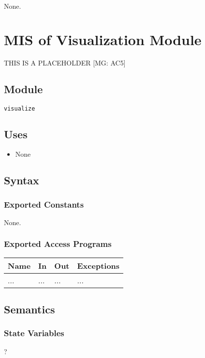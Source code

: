\documentclass[12pt, titlepage]{article}
\begin{document}
None.

\newpage
\section{MIS of Visualization Module} \label{mVisual} 

THIS IS A PLACEHOLDER [MG: AC5]

\subsection{Module}
\texttt{visualize}

\subsection{Uses}
\begin{itemize}
\item None
\end{itemize}

\subsection{Syntax}

\subsubsection{Exported Constants}
None.

\subsubsection{Exported Access Programs}

\begin{center}
\begin{tabular}{p{2cm} p{5cm} p{3cm} p{4cm}}
\hline
\textbf{Name} & \textbf{In} & \textbf{Out} & \textbf{Exceptions} \\
\hline
... & ... & ... & ... \\
\hline
\end{tabular}
\end{center}

\subsection{Semantics}

\subsubsection{State Variables}
?
\end{document}
